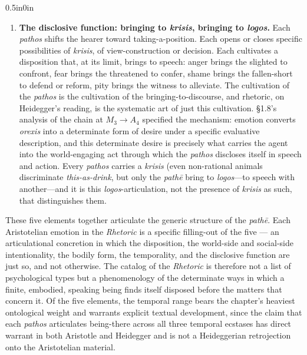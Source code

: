 \documentclass{article}
\begin{document}
\begin{adjustwidth}{0.5in}{0in}
\begin{enumerate}
        \item \textbf{The disclosive function: bringing to \textit{krisis}, bringing to \textit{logos}.} Each \textit{pathos} shifts the hearer toward taking-a-position. Each opens or closes specific possibilities of \textit{krisis}, of view-construction or decision. Each cultivates a disposition that, at its limit, brings to speech: anger brings the slighted to confront, fear brings the threatened to confer, shame brings the fallen-short to defend or reform, pity brings the witness to alleviate. The cultivation of the \textit{pathos} is the cultivation of the bringing-to-discourse, and rhetoric, on Heidegger's reading, is the systematic art of just this cultivation. \S1.8's analysis of the chain at $M_3 \rightarrow A_4$ specified the mechanism: emotion converts \textit{orexis} into a determinate form of desire under a specific evaluative description, and this determinate desire is precisely what carries the agent into the world-engaging act through which the \textit{pathos} discloses itself in speech and action. Every \textit{pathos} carries a \textit{krisis} (even non-rational animals discriminate \textit{this-as-drink}, but only the \textit{pathē} bring to \textit{logos}---to speech with another---and it is this \textit{logos}-articulation, not the presence of \textit{krisis} as such, that distinguishes them.
    \end{enumerate}
\end{adjustwidth}

These five elements together articulate the generic structure of the \textit{pathē}. Each Aristotelian emotion in the \textit{Rhetoric} is a specific filling-out of the five --- an articulational concretion in which the disposition, the world-side and social-side intentionality, the bodily form, the temporality, and the disclosive function are just so, and not otherwise. The catalog of the \textit{Rhetoric} is therefore not a list of psychological types but a phenomenology of the determinate ways in which a finite, embodied, speaking being finds itself disposed before the matters that concern it. Of the five elements, the temporal range bears the chapter's heaviest ontological weight and warrants explicit textual development, since the claim that each \textit{pathos} articulates being-there across all three temporal ecstases has direct warrant in both Aristotle and Heidegger and is not a Heideggerian retrojection onto the Aristotelian material.
\end{document}
